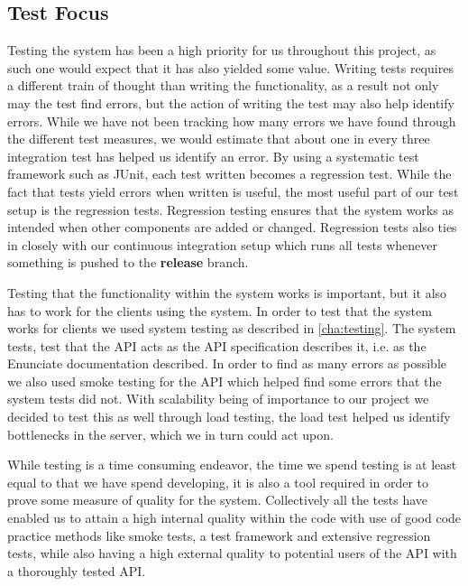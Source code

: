 \subsection{Test Focus}
Testing the system has been a high priority for us throughout this project, as such one would expect that it has also yielded some value.
Writing tests requires a different train of thought than writing the functionality, as a result not only may the test find errors, but the action of writing the test may also help identify errors.
While we have not been tracking how many errors we have found through the different test measures, we would estimate that about one in every three integration test has helped us identify an error.
By using a systematic test framework such as JUnit, each test written becomes a regression test.
While the fact that tests yield errors when written is useful, the most useful part of our test setup is the regression tests.
Regression testing ensures that the system works as intended when other components are added or changed.
Regression tests also ties in closely with our continuous integration setup which runs all tests whenever something is pushed to the \textbf{release} branch.

\bigskip
Testing that the functionality within the system works is important, but it also has to work for the clients using the system.
In order to test that the system works for clients we used system testing as described in \cref{cha:testing}.
The system tests, test that the API acts as the API specification describes it, i.e. as the Enunciate documentation described.%
In order to find as many errors as possible we also used smoke testing for the API which helped find some errors that the system tests did not.
With scalability being of importance to our project we decided to test this as well through load testing, the load test helped us identify bottlenecks in the server, which we in turn could act upon.

While testing is a time consuming endeavor, the time we spend testing is at least equal to that we have spend developing, it is also a tool required in order to prove some measure of quality for the system.
Collectively all the tests have enabled us to attain a high internal quality within the code with use of good code practice methods like smoke tests, a test framework and extensive regression tests, while also having a high external quality to potential users of the API with a thoroughly tested API.

